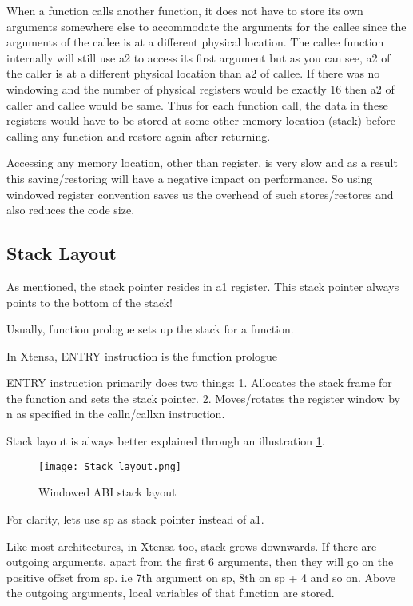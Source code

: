  When a function calls another function, it does not have to store its own arguments somewhere else to accommodate the arguments for the callee since the arguments of the callee is at a different physical location. The callee function internally will still use a2 to access its first argument but as you can see, a2 of the caller is at a different physical location than a2 of callee. If there was no windowing and the number of physical registers would be exactly 16 then a2 of caller and callee would be same. Thus for each function call, the data in these registers would have to be stored at some other memory location (stack) before calling any function and restore again after returning.

Accessing any memory location, other than register, is very slow and as a result this saving/restoring will have a negative impact on performance. So using windowed register convention saves us the overhead of such stores/restores and also reduces the code size.

\subsection{Stack Layout}

As mentioned, the stack pointer resides in a1 register. This stack pointer always points to the bottom of the stack!

Usually, function prologue sets up the stack for a function.

In Xtensa, ENTRY instruction is the function prologue

ENTRY instruction primarily does two things:
1. Allocates the stack frame for the function and sets the stack pointer.
2. Moves/rotates the register window by n as specified in the calln/callxn instruction.

Stack layout is always better explained through an illustration \ref{fig:window-abi-stack-layout}.

\begin{figure}[p]
    \center
    \texttt{[image: Stack\_layout.png]}
    \caption{Windowed ABI stack layout}
    \label{fig:window-abi-stack-layout}
\end{figure}

For clarity, lets use sp as stack pointer instead of a1.

Like most architectures, in Xtensa too, stack grows downwards. If there are outgoing arguments, apart from the first 6 arguments, then they will go on the positive offset from sp. i.e 7th argument on sp, 8th on sp + 4 and so on. Above the outgoing arguments, local variables of that function are stored.

